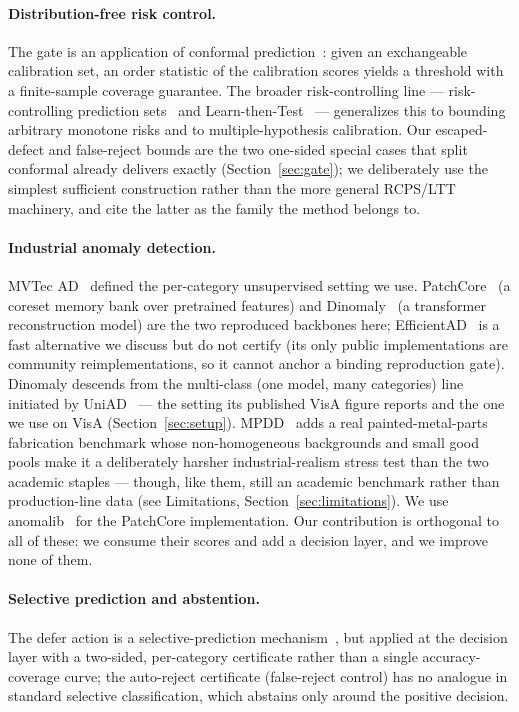 \documentclass[11pt]{article}
\begin{document}
\paragraph{Distribution-free risk control.} The gate is an application of conformal
prediction~\citep{vovk2005algorithmic,lei2018distribution,angelopoulos2023gentle}: given an
exchangeable calibration set, an order statistic of the calibration scores yields a threshold with
a finite-sample coverage guarantee. The broader risk-controlling line ---
risk-controlling prediction sets~\citep{bates2021rcps} and Learn-then-Test~\citep{angelopoulos2021ltt}
--- generalizes this to bounding arbitrary monotone risks and to multiple-hypothesis calibration.
Our escaped-defect and false-reject bounds are the two one-sided special cases that split conformal
already delivers exactly (Section~\ref{sec:gate}); we deliberately use the simplest sufficient
construction rather than the more general RCPS/LTT machinery, and cite the latter as the family the
method belongs to.

\paragraph{Industrial anomaly detection.} MVTec AD~\citep{bergmann2019mvtec} defined the
per-category unsupervised setting we use. PatchCore~\citep{roth2022patchcore} (a coreset memory bank
over pretrained features) and Dinomaly~\citep{guo2025dinomaly} (a transformer reconstruction model)
are the two reproduced backbones here; EfficientAD~\citep{batzner2024efficientad} is a fast
alternative we discuss but do not certify (its only public implementations are community
reimplementations, so it cannot anchor a binding reproduction gate). Dinomaly descends from the
multi-class (one model, many categories) line initiated by UniAD~\citep{you2022unified} --- the
setting its published VisA figure reports and the one we use on VisA
(Section~\ref{sec:setup}). MPDD~\citep{jezek2021mpdd} adds a real painted-metal-parts fabrication
benchmark whose non-homogeneous backgrounds and small good pools make it a deliberately harsher
industrial-realism stress test than the two academic staples --- though, like them, still an
academic benchmark rather than production-line data (see Limitations, Section~\ref{sec:limitations}).
We use
anomalib~\citep{akcay2022anomalib} for the PatchCore implementation. Our contribution is orthogonal
to all of these: we consume their scores and add a decision layer, and we improve none of them.

\paragraph{Selective prediction and abstention.} The defer action is a selective-prediction
mechanism~\citep{geifman2017selective}, but applied at the decision layer with a two-sided,
per-category certificate rather than a single accuracy-coverage curve; the auto-reject certificate
(false-reject control) has no analogue in standard selective classification, which abstains only
around the positive decision.
\end{document}
